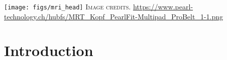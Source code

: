 
    \begin{frame}
        \centering
        \texttt{[image: figs/mri\_head]}
        {\scriptsize \textsc{Image credits.} \url{https://www.pearl-technology.ch/hubfs/MRT_Kopf_PearlFit-Multipad_ProBelt_1-1.png}}
    \end{frame}


    \section{Introduction}
    \addtocounter{framenumber}{-1}

